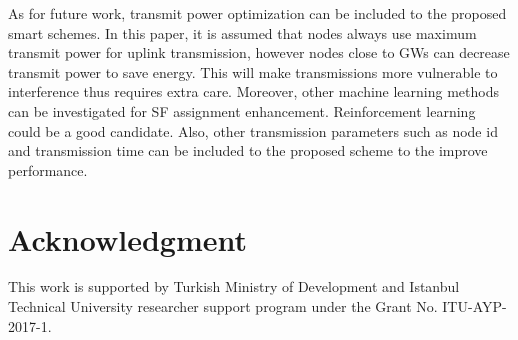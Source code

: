 \documentclass[conference]{IEEEtran}
\begin{document}
\par As for future work, transmit power optimization can be included to the proposed smart schemes. In this paper, it is assumed that nodes always use maximum transmit power for uplink transmission, however nodes close to GWs can decrease transmit power to save energy. This will make transmissions more vulnerable to interference thus requires extra care. Moreover, other machine learning methods can be investigated for SF assignment enhancement. Reinforcement learning could be a good candidate. Also, other transmission parameters such as node id and transmission time can be included to the proposed scheme to the improve performance.


\section*{Acknowledgment}
\par This work is supported by Turkish Ministry of Development and Istanbul Technical University researcher support program under the Grant No. ITU-AYP-2017-1.




\end{document}
